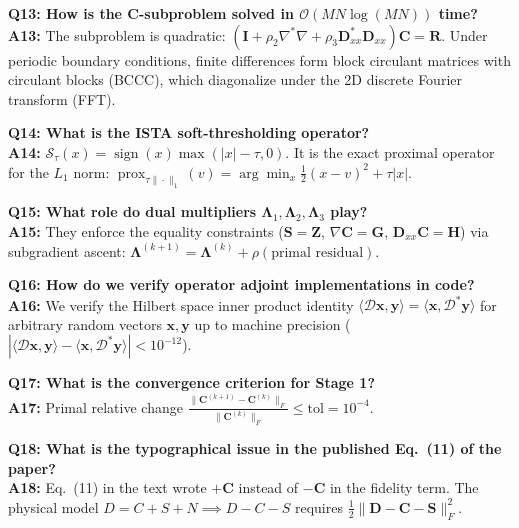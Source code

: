 \documentclass[10pt,conference]{IEEEtran}
\begin{document}
\vspace{0.4em}\noindent\textbf{Q13: How is the $\mathbf{C}$-subproblem solved in $\mathcal{O}(MN \log(MN))$ time?}\\
\textbf{A13:} The subproblem is quadratic: $(\mathbf{I} + \rho_2 \nabla^* \nabla + \rho_3 \mathbf{D}_{xx}^* \mathbf{D}_{xx}) \mathbf{C} = \mathbf{R}$. Under periodic boundary conditions, finite differences form block circulant matrices with circulant blocks (BCCC), which diagonalize under the 2D discrete Fourier transform (FFT).

\vspace{0.4em}\noindent\textbf{Q14: What is the ISTA soft-thresholding operator?}\\
\textbf{A14:} $\mathcal{S}_\tau(x) = \operatorname{sign}(x) \max(|x| - \tau, 0)$. It is the exact proximal operator for the $L_1$ norm: $\operatorname{prox}_{\tau \|\cdot\|_1}(v) = \arg\min_x \frac{1}{2} (x - v)^2 + \tau |x|$.

\vspace{0.4em}\noindent\textbf{Q15: What role do dual multipliers $\mathbf{\Lambda}_1, \mathbf{\Lambda}_2, \mathbf{\Lambda}_3$ play?}\\
\textbf{A15:} They enforce the equality constraints ($\mathbf{S} = \mathbf{Z}$, $\nabla \mathbf{C} = \mathbf{G}$, $\mathbf{D}_{xx} \mathbf{C} = \mathbf{H}$) via subgradient ascent: $\mathbf{\Lambda}^{(k+1)} = \mathbf{\Lambda}^{(k)} + \rho (\text{primal residual})$.

\vspace{0.4em}\noindent\textbf{Q16: How do we verify operator adjoint implementations in code?}\\
\textbf{A16:} We verify the Hilbert space inner product identity $\langle \mathcal{D} \mathbf{x}, \mathbf{y} \rangle = \langle \mathbf{x}, \mathcal{D}^* \mathbf{y} \rangle$ for arbitrary random vectors $\mathbf{x}, \mathbf{y}$ up to machine precision ($| \langle \mathcal{D}\mathbf{x}, \mathbf{y} \rangle - \langle \mathbf{x}, \mathcal{D}^*\mathbf{y} \rangle | < 10^{-12}$).

\vspace{0.4em}\noindent\textbf{Q17: What is the convergence criterion for Stage 1?}\\
\textbf{A17:} Primal relative change $\frac{\|\mathbf{C}^{(k+1)} - \mathbf{C}^{(k)}\|_F}{\|\mathbf{C}^{(k)}\|_F} \le \text{tol} = 10^{-4}$.

\vspace{0.4em}\noindent\textbf{Q18: What is the typographical issue in the published Eq.~(11) of the paper?}\\
\textbf{A18:} Eq.~(11) in the text wrote $+\mathbf{C}$ instead of $-\mathbf{C}$ in the fidelity term. The physical model $D = C + S + N \implies D - C - S$ requires $\frac{1}{2} \|\mathbf{D} - \mathbf{C} - \mathbf{S}\|_F^2$.
\end{document}
